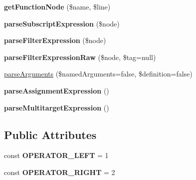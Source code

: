 \begin{DoxyCompactItemize}
\item 
{\bfseries get\+Function\+Node} (\$name, \$line)\hypertarget{classTwig__ExpressionParser_a42bb96caa1ffbb26eadaa26c7a02c8ad}{}\label{classTwig__ExpressionParser_a42bb96caa1ffbb26eadaa26c7a02c8ad}

\item 
{\bfseries parse\+Subscript\+Expression} (\$node)\hypertarget{classTwig__ExpressionParser_a5d2b55cb6c28b262b04b08dca29db9b5}{}\label{classTwig__ExpressionParser_a5d2b55cb6c28b262b04b08dca29db9b5}

\item 
{\bfseries parse\+Filter\+Expression} (\$node)\hypertarget{classTwig__ExpressionParser_a5494b700259abcabf5824459111ce8eb}{}\label{classTwig__ExpressionParser_a5494b700259abcabf5824459111ce8eb}

\item 
{\bfseries parse\+Filter\+Expression\+Raw} (\$node, \$tag=null)\hypertarget{classTwig__ExpressionParser_a8a2e7c79a4d2e62b33dcea3b3d11ffcf}{}\label{classTwig__ExpressionParser_a8a2e7c79a4d2e62b33dcea3b3d11ffcf}

\item 
\hyperlink{classTwig__ExpressionParser_ab845f130d510752d058c3216f5faefc0}{parse\+Arguments} (\$named\+Arguments=false, \$definition=false)
\item 
{\bfseries parse\+Assignment\+Expression} ()\hypertarget{classTwig__ExpressionParser_a7df1c5d55900d2a1f3bb453770e39d98}{}\label{classTwig__ExpressionParser_a7df1c5d55900d2a1f3bb453770e39d98}

\item 
{\bfseries parse\+Multitarget\+Expression} ()\hypertarget{classTwig__ExpressionParser_aaa80f445012c75068598f3c0d8ec6de3}{}\label{classTwig__ExpressionParser_aaa80f445012c75068598f3c0d8ec6de3}

\end{DoxyCompactItemize}
\subsection*{Public Attributes}
\begin{DoxyCompactItemize}
\item 
const {\bfseries O\+P\+E\+R\+A\+T\+O\+R\+\_\+\+L\+E\+FT} = 1\hypertarget{classTwig__ExpressionParser_abacd6aad0ba1dc4971fb19cb94b63652}{}\label{classTwig__ExpressionParser_abacd6aad0ba1dc4971fb19cb94b63652}

\item 
const {\bfseries O\+P\+E\+R\+A\+T\+O\+R\+\_\+\+R\+I\+G\+HT} = 2\hypertarget{classTwig__ExpressionParser_a2efd9845bbd40baaa6c0321a19d19c01}{}\label{classTwig__ExpressionParser_a2efd9845bbd40baaa6c0321a19d19c01}

\end{DoxyCompactItemize}

